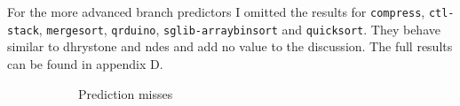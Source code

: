 \documentclass[12pt,twoside,notitlepage]{report}
\begin{document}
For the more advanced branch predictors I omitted the results for \texttt{compress},  \texttt{ctl-stack}, \texttt{mergesort}, \texttt{qrduino}, \texttt{sglib-arraybinsort} and \texttt{quicksort}. They behave similar to dhrystone and ndes and add no value to the discussion. The full results can be found in appendix D.

\begin{figure}[htp]
\centering
\begin{subfigure}[b]{\textwidth}
\caption{Prediction misses}
\end{subfigure}
\begin{subfigure}[b]{\textwidth}

\end{subfigure}
\end{figure}
\end{document}
